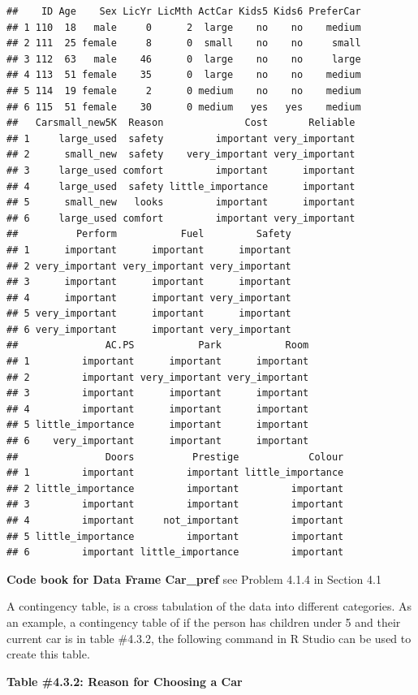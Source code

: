 \documentclass[
]{book}
\begin{document}
\begin{verbatim}
##    ID Age    Sex LicYr LicMth ActCar Kids5 Kids6 PreferCar
## 1 110  18   male     0      2  large    no    no    medium
## 2 111  25 female     8      0  small    no    no     small
## 3 112  63   male    46      0  large    no    no     large
## 4 113  51 female    35      0  large    no    no    medium
## 5 114  19 female     2      0 medium    no    no    medium
## 6 115  51 female    30      0 medium   yes   yes    medium
##   Carsmall_new5K  Reason              Cost       Reliable
## 1     large_used  safety         important very_important
## 2      small_new  safety    very_important very_important
## 3     large_used comfort         important      important
## 4     large_used  safety little_importance      important
## 5      small_new   looks         important      important
## 6     large_used comfort         important very_important
##          Perform           Fuel         Safety
## 1      important      important      important
## 2 very_important very_important very_important
## 3      important      important      important
## 4      important      important very_important
## 5 very_important      important      important
## 6 very_important      important very_important
##               AC.PS           Park           Room
## 1         important      important      important
## 2         important very_important very_important
## 3         important      important      important
## 4         important      important      important
## 5 little_importance      important      important
## 6    very_important      important      important
##               Doors          Prestige            Colour
## 1         important         important little_importance
## 2 little_importance         important         important
## 3         important         important         important
## 4         important     not_important         important
## 5 little_importance         important         important
## 6         important little_importance         important
\end{verbatim}

\textbf{Code book for Data Frame Car\_pref} see Problem 4.1.4 in Section 4.1

A contingency table, is a cross tabulation of the data into different categories. As an example, a contingency table of if the person has children under 5 and their current car is in table \#4.3.2, the following command in R Studio can be used to create this table.

\textbf{Table \#4.3.2: Reason for Choosing a Car}
\end{document}
